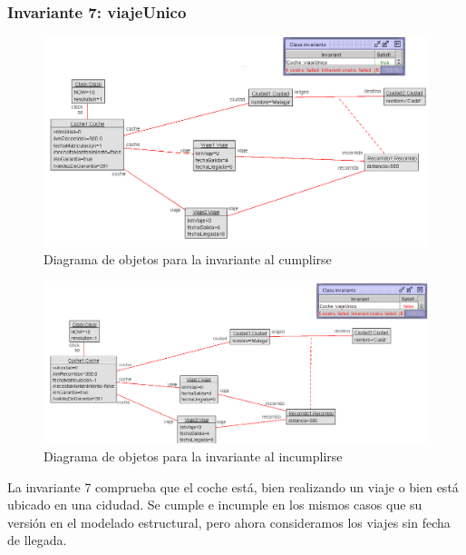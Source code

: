 \documentclass[12pt.a4paper]{article}
\begin{document}
\subsubsection{Invariante 7: viajeUnico}
\vspace{1.0 cm}
\begin{figure}[H]
     \includegraphics[width=1\linewidth]{Soils/dinamicoInv7_true.png}
     \caption{Diagrama de objetos para la invariante al cumplirse}
\end{figure}
\begin{figure}[H]
     \includegraphics[width=1\linewidth]{Soils/dinamicoInv7_false.png}
     \caption{Diagrama de objetos para la invariante al incumplirse}
\end{figure}
La invariante 7 comprueba que el coche está, bien realizando un viaje o bien está ubicado en una cidudad. Se cumple e incumple en los mismos casos que su versión en el modelado estructural, pero ahora consideramos los viajes sin fecha de llegada.
\end{document}
